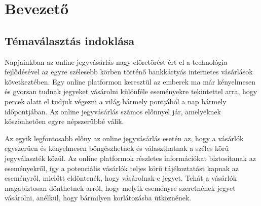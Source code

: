 \chapter{Bevezető}%


\section {Témaválasztás indoklása}

Napjainkban az online jegyvásárlás nagy előretörést ért el a technológia fejlődésével az egyre szélesebb körben történő bankkártyás internetes vásárlások következtében. Egy online platformon keresztül az emberek ma már kényelmesen és gyorsan tudnak jegyeket vásárolni különféle eseményekre tekintettel arra, hogy percek alatt el tudjuk végezni a világ bármely pontjából a nap bármely időpontjában. Az online jegyvásárlás számos előnnyel jár, amelyeknek köszönhetően egyre népszerűbbé válik.

Az egyik legfontosabb előny az online jegyvásárlás esetén az, hogy a vásárlók egyszerűen és kényelmesen böngészhetnek és választhatnak a széles körű jegyválaszték közül. Az online platformok részletes információkat biztosítanak az eseményekről, így a potenciális vásárlók teljes körű tájékoztatást kapnak az eseményről, mielőtt eldöntenék, hogy vásárolnak-e jegyet. Tehát a vásárlók magabiztosan dönthetnek arról, hogy melyik eseményre szeretnének jegyet vásárolni, anélkül, hogy bármilyen korlátozásba ütköznének.

